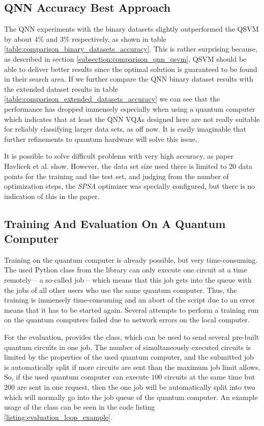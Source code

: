 \subsection{QNN Accuracy Best Approach}
The QNN experiments with the binary datasets slightly outperformed the QSVM by about 4\% and 3\% respectively, as shown in table \ref{table:comparison_binary_datasets_accuracy}. This is rather surprising because, as described in section \ref{subsection:comparison_qnn_qsvm}, QSVM should be able to deliver better results since the optimal solution is guaranteed to be found in their search area. If we further compare the QNN binary dataset results with the extended dataset results in table \ref{table:comparison_extended_datasets_accuracy} we can see that the performance has dropped immensely especially when using a quantum computer which indicates that at least the QNN VQAs designed here are not really suitable for reliably classifying larger data sets, as off now. It is easily imaginable that further refinements to quantum hardware will solve this issue. \par
It is possible to solve difficult problems with very high accuracy, as paper Havlicek et al.\cite{havlicekSupervisedLearningQuantum2019} show. However, the data set size used there is limited to 20 data points for the training and the test set, and judging from the number of optimization steps, the \textit{SPSA} optimizer was specially configured, but there is no indication of this in the paper.

\subsection{Training And Evaluation On A Quantum Computer}
Training on the quantum computer is already possible, but very time-consuming. The used Python class  from the  library can only execute one circuit at a time remotely – a so-called job – which means that this job gets into the queue with the jobs of all other users who use the same quantum computer. Thus, the training is immensely time-consuming and an abort of the script due to an error means that it has to be started again. Several attempts to perform a training run on the quantum computers failed due to network errors on the local computer.\par
For the evaluation,  provides the  class, which can be used to send several pre-built quantum circuits in one job. The number of simultaneously executed circuits is limited by the properties of the used quantum computer, and the submitted job is automatically split if more circuits are sent than the maximum job limit allows. So, if the used quantum computer can execute $100$ circuits at the same time but $200$ are sent in one request, then the one job will be automatically split into two which will normally go into the job queue of the quantum computer. An example usage of the  class can be seen in the code listing \ref{listing:evaluation_loop_example}.


